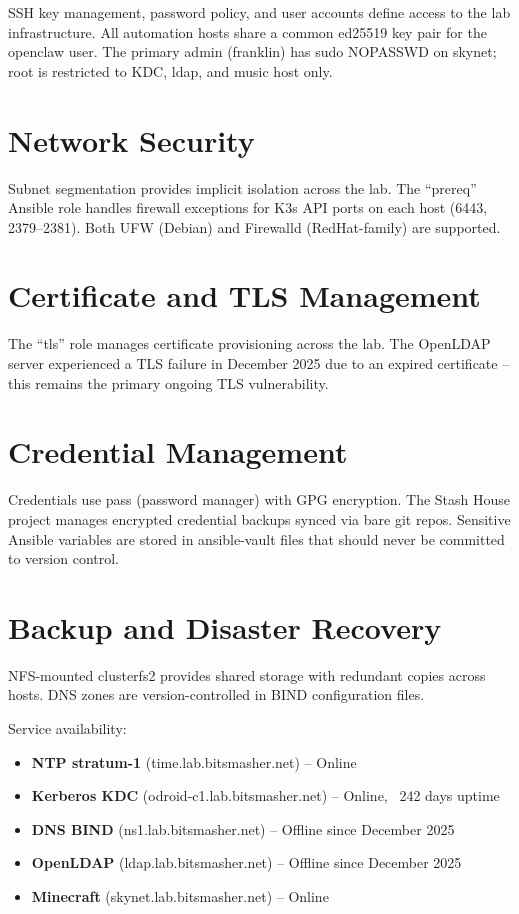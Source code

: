 SSH key management, password policy, and user accounts define access to the lab infrastructure. All automation hosts share a common ed25519 key pair for the openclaw user. The primary admin (franklin) has sudo NOPASSWD on skynet; root is restricted to KDC, ldap, and music host only.

\section{Network Security}

Subnet segmentation provides implicit isolation across the lab. The ``prereq'' Ansible role handles firewall exceptions for K3s API ports on each host (6443, 2379--2381). Both UFW (Debian) and Firewalld (RedHat-family) are supported.

\section{Certificate and TLS Management}

The ``tls'' role manages certificate provisioning across the lab. The OpenLDAP server experienced a TLS failure in December 2025 due to an expired certificate -- this remains the primary ongoing TLS vulnerability.

\section{Credential Management}

Credentials use pass (password manager) with GPG encryption. The Stash House project manages encrypted credential backups synced via bare git repos. Sensitive Ansible variables are stored in ansible-vault files that should never be committed to version control.

\section{Backup and Disaster Recovery}

NFS-mounted clusterfs2 provides shared storage with redundant copies across hosts. DNS zones are version-controlled in BIND configuration files.

Service availability:

\begin{itemize}
  \item \textbf{NTP stratum-1} (time.lab.bitsmasher.net) -- Online
  \item \textbf{Kerberos KDC} (odroid-c1.lab.bitsmasher.net) -- Online, ~242 days uptime
  \item \textbf{DNS BIND} (ns1.lab.bitsmasher.net) -- Offline since December 2025
  \item \textbf{OpenLDAP} (ldap.lab.bitsmasher.net) -- Offline since December 2025
  \item \textbf{Minecraft} (skynet.lab.bitsmasher.net) -- Online
\end{itemize}

